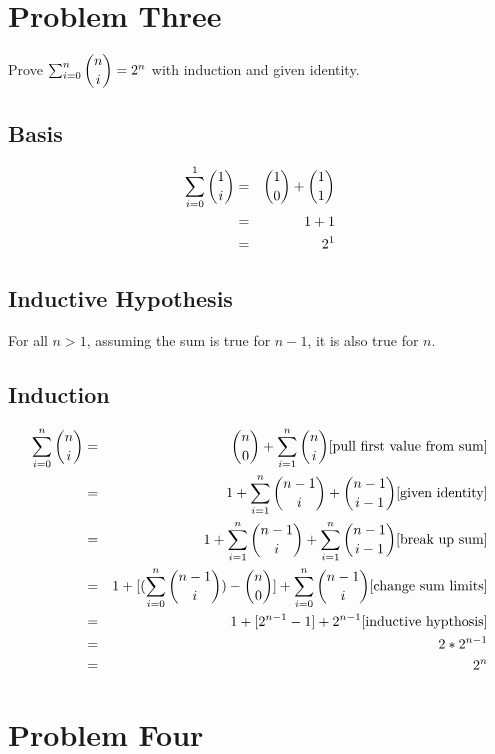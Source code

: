 \documentclass[a4paper,12pt]{article}
\begin{document}
\section{Problem Three}
Prove \(\sum_{i=0}^{n} \dbinom{n}{i} = 2^n\) with induction and given identity.
\subsection{Basis}
\begin{eqnarray*}
  \sum_{i=0}^{1} \dbinom{1}{i} &=& \dbinom{1}{0} + \dbinom{1}{1} \\
  &=& 1 + 1 \\
  &=& 2^1 \\
\end{eqnarray*}
\subsection{Inductive Hypothesis}
For all \(n > 1\), assuming the sum is true for \(n-1\), it is also true for \(n\).
\subsection{Induction}
\begin{eqnarray*}
  \sum_{i=0}^{n} \dbinom{n}{i} &=& \dbinom{n}{0} + \sum_{i=1}^{n} \dbinom{n}{i} \text{[pull first value from sum]} \\
  &=& 1 + \sum_{i=1}^{n} \dbinom{n-1}{i} + \dbinom{n-1}{i-1} \text{[given identity]} \\
  &=& 1 + \sum_{i=1}^{n} \dbinom{n-1}{i} + \sum_{i=1}^{n} \dbinom{n-1}{i-1} \text{[break up sum]} \\
  &=& 1 + [(\sum_{i=0}^{n} \dbinom{n-1}{i}) - \dbinom{n}{0}] + \sum_{i=0}^{n} \dbinom{n-1}{i} \text{[change sum limits]} \\
  &=& 1 + [2^{n-1} - 1] + 2^{n-1} \text{[inductive hypthosis]} \\
  &=& 2*2^{n-1} \\
  &=& 2^n
\end{eqnarray*}
\section{Problem Four}
\end{document}
